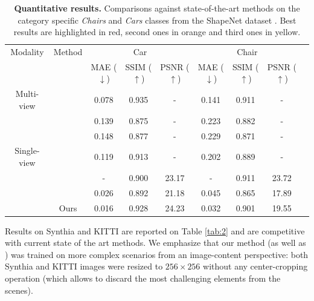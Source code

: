 \begin{table}[h!]
    \caption{\textbf{Quantitative results.} Comparisons against state-of-the-art methods on the category specific \textit{Chairs} and \textit{Cars} classes from the ShapeNet dataset \citep{chang2015shapenet}. Best results are highlighted in \colorbox{red!25}{red}, second ones in \colorbox{orange!25}{orange} and third ones in \colorbox{yellow!25}{yellow}. }
    \label{tab:1}
    \begin{center}%
    \begin{adjustbox}{width = \linewidth}
    \begin{tabular}[h]{c||cccccccc}
    \hline
     Modality & Method & \multicolumn{3}{c}{Car} & \multicolumn{3}{c}{Chair} \\
     & &  MAE ($\downarrow$) & SSIM ($\uparrow$) & PSNR ($\uparrow$) & MAE ($\downarrow$) & SSIM ($\uparrow$) & PSNR ($\uparrow$)\\
    \hline
    Multi-view & \citep{sun2018multiview}& 0.078 & 0.935 & - & 0.141 & 0.911 & - \\
    \hline
     & \citep{tatarchenko2015single} & 0.139 & 0.875 & - & 0.223 & 0.882 & -\\
    &  \citep{zhou2016view} & 0.148 & 0.877 & - & 0.229 & 0.871 & - \\
    Single-view &  \citep{park2017transformation} & \cellcolor{yellow!25}0.119 & \cellcolor{orange!25}0.913 & - & \cellcolor{yellow!25}0.202 & \cellcolor{yellow!25}0.889& -\\
     &  \citep{yu2021pixelnerf} & - & \cellcolor{yellow!25}0.900 & \cellcolor{orange!25}23.17 & - & \cellcolor{red!25}0.911 & \cellcolor{red!25}23.72 \\
     &  \citep{kim2020novel} & \cellcolor{orange!25}0.026 & 0.892 & \cellcolor{yellow!25}21.18 & \cellcolor{orange!25}0.045 & 0.865 & \cellcolor{yellow!25}17.89 \\
     & Ours & \cellcolor{red!25}0.016 & \cellcolor{red!25}0.928 & \cellcolor{red!25}24.23 & \cellcolor{red!25}0.032 & \cellcolor{orange!25}0.901 & \cellcolor{orange!25}19.55 \\
     
    \hline 
    \end{tabular}
    \end{adjustbox}
    \end{center}
    \end{table}

 Results on Synthia \citep{ros2016synthia} and KITTI \citep{geiger2012we} are reported on Table \ref{tab:2} and are competitive with current state of the art methods. We emphasize that our method (as well as \citep{kim2020novel}) was trained on more complex scenarios from an image-content perspective: both Synthia and KITTI images were resized to $256\times 256$ without any center-cropping operation (which allows to discard the most challenging elements from the scenes). 

